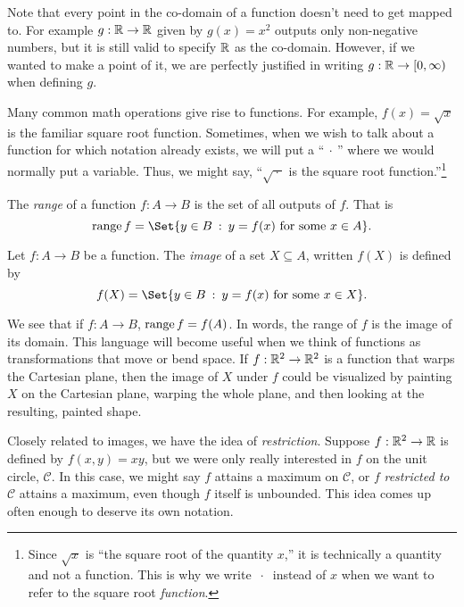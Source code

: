 	
	Note that every point in the co-domain of a function doesn't need to get mapped
	to.  For example $g:\mathbb{R}\to\mathbb{R}$ given by $g(x)=x^2$ outputs only non-negative numbers,
	but it is still valid to specify $\mathbb{R}$ as the co-domain.  However, if we wanted
	to make a point of it, we are perfectly justified in writing $g:\mathbb{R}\to[0,\infty)$
	when defining $g$.

	Many common math operations give rise to functions.  For example,  
	$f(x)=\sqrt{x}$ is the familiar
	square root function.  Sometimes, when we wish to talk about a function
	for which notation already exists, we will put a ``$\ \cdot\ $'' where we would
	normally put a variable.  Thus, we might say, ``$\sqrt{\:\cdot\:}$ is the square
	root function.''\footnote{ Since $\sqrt{x}$ is ``the square root of the quantity
	$x$,'' it is technically a quantity and not a function.  This is why we write $\ \cdot\ $ instead
	of $x$ when we want to refer to the square root \emph{function}.
	}

	\begin{definition}[Range]
		The \emph{range} of a function $f:A\to B$
		is the set of all outputs of $f$.  That is
		\[
			\Range f = \Set{y\in B\given y=f(x)\text{ for some }x\in A}.
		\]
	\end{definition}
	\begin{definition}[Image]
		Let $f:A\to B$ be a function.
		The \emph{image} of a set $X\subseteq A$, written $f(X)$ is
		defined by
		\[
			f(X)=\Set{y\in B\given y=f(x)\text{ for some }x\in X}.
		\]
	\end{definition}

	We see that if $f:A\to B$, $\operatorname{range} f = f(A)$.  In words, the range of $f$ is the image
	of its domain.  This language will become useful when we think of functions as transformations
	that move or bend space.  If $f:\mathbb{R}^2\to\mathbb{R}^2$ is a function that warps the Cartesian plane,
	then the image of $X$ under $f$ could be visualized by painting $X$ on the Cartesian plane,
	warping the whole plane, and then looking at the resulting, painted shape.  


	Closely related to images, we have the idea of \emph{restriction}.
	Suppose $f:\mathbb{R}^2\to\mathbb{R}$ is defined by $f(x,y)=xy$, but we were only really interested in $f$ on the unit circle, $\mathcal C$.
	In this case, we might say $f$ attains a maximum on $\mathcal C$, or $f$ 
	\emph{restricted to} $\mathcal C$ attains a maximum, even though $f$ itself is unbounded.
	This idea comes up often enough to deserve its own notation.

